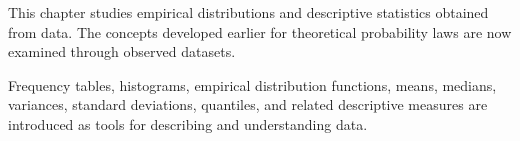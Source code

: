 This chapter studies empirical distributions and descriptive statistics obtained from data. The concepts developed earlier for theoretical probability laws are now examined through observed datasets.

Frequency tables, histograms, empirical distribution functions, means, medians, variances, standard deviations, quantiles, and related descriptive measures are introduced as tools for describing and understanding data.